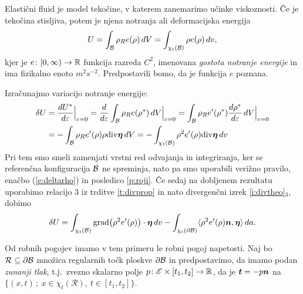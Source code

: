 Elastični fluid je model tekočine, v katerem zanemarimo učinke viskoznosti. Če je tekočina
stisljiva, potem je njena notranja ali deformacijska energija
\[ U=\int_{\mathcal B}\rho_R e(\rho)\,dV=\int_{\chi_t(\mathcal B)}\rho e(\rho)\,dv, \]
kjer je $e\colon[0,\infty)\to\mathbb R$ funkcija razreda $C^2$, imenovana
\emph{gostota notranje energije} in ima fizikalno enoto $m^2s^{-2}$.
Predpostavili bomo, da je funkcija $e$ poznana.

Izračunajmo variacijo notranje energije:
\begin{align*} 
	\delta U &=\frac{dU^*}{d\varepsilon}\Big|_{\varepsilon=0}=\frac{d}{d\varepsilon}
	\int_{\mathcal B}\rho_R e(\rho^*)\,dV \Big|_{\varepsilon=0} =
	\int_{\mathcal B}\rho_R e'(\rho^*)\frac{d\rho^*}{d\varepsilon}\,dV \Big|_{\varepsilon=0} \\
	&= -\int_{\mathcal B}\rho_R e'(\rho)\rho\mathrm{div}\boldsymbol \eta\,dV
	= -\int_{\chi_t(\mathcal B)}\rho^2 e'(\rho)\mathrm{div}\boldsymbol \eta\,dv
\end{align*}
Pri tem smo smeli zamenjati vrstni red odvajanja in integriranja, ker se referenčna
konfiguracija $\mathcal B$ ne spreminja, nato pa smo uporabili verižno pravilo, enačbo
(\ref{e:deltarho}) in posledico \ref{p:roji}.
Če sedaj na dobljenem rezultatu uporabimo relacijo 3 iz trditve \ref{t:divprop} in
nato divergenčni izrek \ref{i:divtheo}$_3$, dobimo
\begin{equation} \label{e:varpot}
	\delta U=\int_{\chi_t(\mathcal B)}\mathrm{grad}\big(\rho^2 e'(\rho)\big)\cdot\boldsymbol \eta\,dv
	-\int_{\chi_t(\partial \mathcal B)}\langle\rho^2 e'(\rho)\boldsymbol n,\boldsymbol \eta\rangle\,da.
\end{equation}

Od robnih pogojev imamo v tem primeru le robni pogoj napetosti.
Naj bo $\mathcal{R}\subseteq\partial \mathcal B$ množica regularnih točk ploskve $\partial \mathcal B$ in
predpostavimo, da imamo podan \emph{zunanji tlak}, t.j.~zvezno skalarno polje
$p\colon \mathscr E\times[t_1,t_2]\to\mathbb R$, da je $\boldsymbol t=-p\boldsymbol n$ na
$\{(x,t)\,;\ x\in\chi_t(\mathcal{R}),\ t\in[t_1,t_2]\}$.

